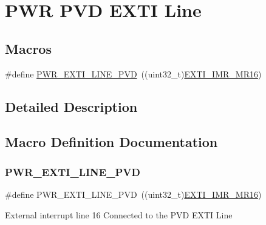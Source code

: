 \hypertarget{group___p_w_r___p_v_d___e_x_t_i___line}{}\section{P\+WR P\+VD E\+X\+TI Line}
\label{group___p_w_r___p_v_d___e_x_t_i___line}
\subsection*{Macros}
\begin{DoxyCompactItemize}
\item 
\#define \hyperlink{group___p_w_r___p_v_d___e_x_t_i___line_ga43a49255649e03d2d2b6b12c5c379d2b}{P\+W\+R\+\_\+\+E\+X\+T\+I\+\_\+\+L\+I\+N\+E\+\_\+\+P\+VD}~((uint32\+\_\+t)\hyperlink{group___peripheral___registers___bits___definition_ga7419f78ed9044bdd237b452ef49e1b7f}{E\+X\+T\+I\+\_\+\+I\+M\+R\+\_\+\+M\+R16})
\end{DoxyCompactItemize}


\subsection{Detailed Description}


\subsection{Macro Definition Documentation}
\mbox{\label{group___p_w_r___p_v_d___e_x_t_i___line_ga43a49255649e03d2d2b6b12c5c379d2b}} 
\subsubsection{\texorpdfstring{P\+W\+R\+\_\+\+E\+X\+T\+I\+\_\+\+L\+I\+N\+E\+\_\+\+P\+VD}{PWR\_EXTI\_LINE\_PVD}}
{\footnotesize\ttfamily \#define P\+W\+R\+\_\+\+E\+X\+T\+I\+\_\+\+L\+I\+N\+E\+\_\+\+P\+VD~((uint32\+\_\+t)\hyperlink{group___peripheral___registers___bits___definition_ga7419f78ed9044bdd237b452ef49e1b7f}{E\+X\+T\+I\+\_\+\+I\+M\+R\+\_\+\+M\+R16})}

External interrupt line 16 Connected to the P\+VD E\+X\+TI Line 